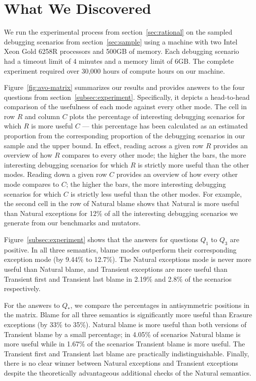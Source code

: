 \section{What We Discovered}



We run the experimental process from section~\ref{sec:rational} on the
sampled debugging scenarios from section~\ref{sec:sample} using a machine with two Intel Xeon Gold 6258R processors and 500GB of memory.
Each debugging scenario had a timeout limit of 4 minutes and a
memory limit of 6GB. The complete experiment required
over 30,000 hours of compute hours on our machine.


Figure~\ref{fig:avo-matrix} summarizes our results and provides answers to
the four questions from section~\ref{subsec:experiment}.  Specifically, it
depicts a head-to-head comparison of the usefulness of each mode against
every other mode.  The cell in row $R$ and column $C$ plots the percentage
of interesting debugging scenarios for which $R$ is more useful $C$ ---
this percentage has been calculated as an estimated proportion from the
corresponding proportion of the debugging scenarios in our sample and the
upper bound.  In effect, reading across a given row $R$ provides an
overview of how $R$ compares to every other mode; the higher the bars, the
more interesting debugging scenarios for which $R$ is strictly more useful
than the other modes.  Reading down a given row $C$ provides an overview
of how every other mode compares to $C$; the higher the bars, the more
interesting debugging scenarios for which $C$ is strictly less useful than
the other modes. For example, the second cell in the row of Natural blame
shows that Natural is more useful than Natural exceptions for 12\% of all
the interesting debugging scenarios we generate from our benchmarks and
mutators. 

Figure~\ref{subsec:experiment} shows that the answers for questions $Q_1$
to $Q_3$ are positive. In all three semantics, blame modes outperform
their corresponding exception mode (by 9.44\% to 12.7\%). The Natural
exceptions mode is never more useful than Natural blame, and  Transient
exceptions are more useful than Transient first and Transient last blame
in 2.19\% and 2.8\% of the scenarios respectively. 


For the answers to $Q_*$, we compare the percentages in antisymmetric
positions in the matrix. Blame for all three semantics is significantly
more useful than Erasure exceptions (by 33\% to 35\%). Natural blame is
more useful than both versions of Transient blame by a small percentage;
in 4.05\% of scenarios Natural blame is more useful while in 1.67\% of the
scenarios Transient blame is more useful. The Transient first and
Transient last blame are practically indistinguishable. Finally, there is
no clear winner between Natural exceptions and Transient exceptions
despite the theoretically advantageous additional checks of the Natural
semantics.

